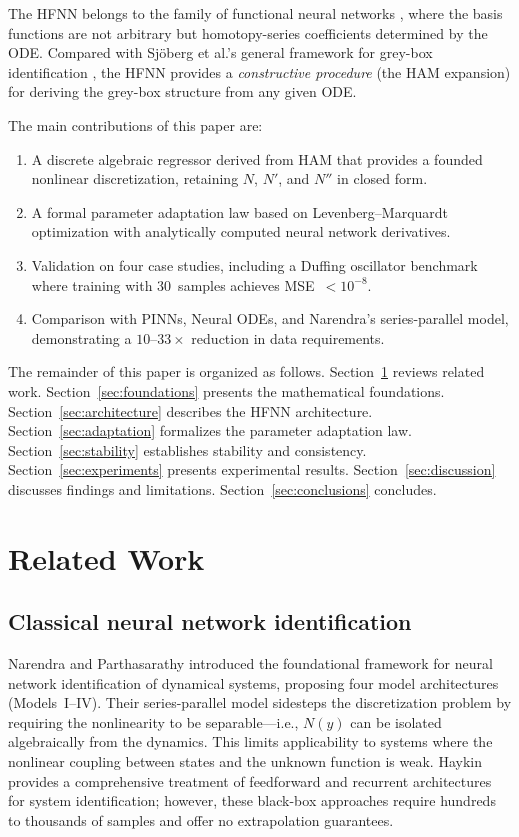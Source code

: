 \documentclass[preprint,12pt]{elsarticle}
\begin{document}
The HFNN belongs to the family of functional neural networks \cite{castillo1998}, where the basis functions are not arbitrary but homotopy-series coefficients determined by the ODE. Compared with Sj\"oberg et al.'s general framework for grey-box identification \cite{sjoberg1995}, the HFNN provides a \emph{constructive procedure} (the HAM expansion) for deriving the grey-box structure from any given ODE.

The main contributions of this paper are:
\begin{enumerate}
\item A discrete algebraic regressor derived from HAM that provides a founded nonlinear discretization, retaining $N$, $N'$, and $N''$ in closed form.
\item A formal parameter adaptation law based on Levenberg--Marquardt optimization with analytically computed neural network derivatives.
\item Validation on four case studies, including a Duffing oscillator benchmark where training with 30~samples achieves MSE~$< 10^{-8}$.
\item Comparison with PINNs, Neural ODEs, and Narendra's series-parallel model, demonstrating a $10$--$33\times$ reduction in data requirements.
\end{enumerate}

The remainder of this paper is organized as follows. Section~\ref{sec:related} reviews related work. Section~\ref{sec:foundations} presents the mathematical foundations. Section~\ref{sec:architecture} describes the HFNN architecture. Section~\ref{sec:adaptation} formalizes the parameter adaptation law. Section~\ref{sec:stability} establishes stability and consistency. Section~\ref{sec:experiments} presents experimental results. Section~\ref{sec:discussion} discusses findings and limitations. Section~\ref{sec:conclusions} concludes.


\section{Related Work}
\label{sec:related}

\subsection{Classical neural network identification}
Narendra and Parthasarathy \cite{narendra1990} introduced the foundational framework for neural network identification of dynamical systems, proposing four model architectures (Models~I--IV). Their series-parallel model sidesteps the discretization problem by requiring the nonlinearity to be separable---i.e., $N(y)$ can be isolated algebraically from the dynamics. This limits applicability to systems where the nonlinear coupling between states and the unknown function is weak. Haykin \cite{haykin2009} provides a comprehensive treatment of feedforward and recurrent architectures for system identification; however, these black-box approaches require hundreds to thousands of samples and offer no extrapolation guarantees.
\end{document}
